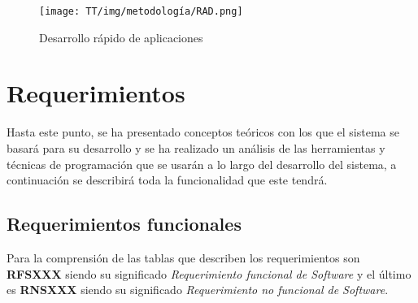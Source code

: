 \begin{figure}[!ht]
    \centering
    \texttt{[image: TT/img/metodología/RAD.png]}
    \caption{Desarrollo rápido de aplicaciones}
    \label{graphic:RAD}
\end{figure}
\section{Requerimientos}
Hasta este punto, se ha presentado conceptos teóricos con los que el sistema se basará para su desarrollo y se ha realizado un análisis de las herramientas y técnicas de programación que se usarán a lo largo del desarrollo del sistema, a continuación se describirá toda la funcionalidad que este tendrá.

\subsection{Requerimientos funcionales}
Para la comprensión de las tablas que describen los requerimientos son \textbf{RFSXXX} siendo su significado \textit{Requerimiento funcional de Software} y el último es \textbf{RNSXXX} siendo su significado \textit{Requerimiento no funcional de Software}.

